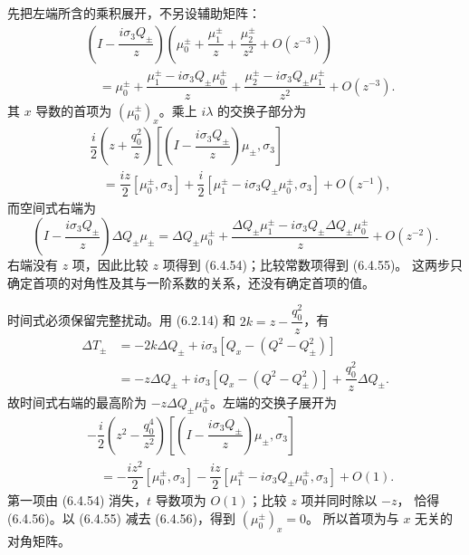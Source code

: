 \documentclass[lang=cn,scheme=chinese,mode=simple,device=normal,color=blue,
math=cm,thmcnt=section,12pt]{elegantbook}
\begin{document}
\begin{callout}[计算：(6.4.52)–(6.4.56) 的乘法展开与逐幂比较]
    先把左端所含的乘积展开，不另设辅助矩阵：
    \[
        \begin{aligned}
             & \left(I-\dfrac{i\sigma_3Q_\pm}{z}\right)
            \left(\mu_0^\pm+\dfrac{\mu_1^\pm}{z}+\dfrac{\mu_2^\pm}{z^2}+O(z^{-3})\right) \\
             & \quad=\mu_0^\pm+\dfrac{\mu_1^\pm-i\sigma_3Q_\pm\mu_0^\pm}{z}
            +\dfrac{\mu_2^\pm-i\sigma_3Q_\pm\mu_1^\pm}{z^2}+O(z^{-3}).
        \end{aligned}
    \]
    其 $x$ 导数的首项为 $(\mu_0^\pm)_x$。乘上 $i\lambda$ 的交换子部分为
    \[
        \begin{aligned}
             & \dfrac{i}{2}\left(z+\dfrac{q_0^2}{z}\right)
            \left[\left(I-\dfrac{i\sigma_3Q_\pm}{z}\right)\mu_\pm,\sigma_3\right] \\
             & \quad=\dfrac{iz}{2}[\mu_0^\pm,\sigma_3]
            +\dfrac{i}{2}[\mu_1^\pm-i\sigma_3Q_\pm\mu_0^\pm,\sigma_3]+O(z^{-1}),
        \end{aligned}
    \]
    而空间式右端为
    \[
        \left(I-\dfrac{i\sigma_3Q_\pm}{z}\right)\Delta Q_\pm\mu_\pm
        =\Delta Q_\pm\mu_0^\pm
        +\dfrac{\Delta Q_\pm\mu_1^\pm-i\sigma_3Q_\pm\Delta Q_\pm\mu_0^\pm}{z}
        +O(z^{-2}).
    \]
    右端没有 $z$ 项，因此比较 $z$ 项得到 (6.4.54)；比较常数项得到 (6.4.55)。
    这两步只确定首项的对角性及其与一阶系数的关系，还没有确定首项的值。

    时间式必须保留完整扰动。用 (6.2.14) 和 $2k=z-\dfrac{q_0^2}{z}$，有
    \[
        \begin{aligned}
            \Delta T_\pm
             & =-2k\Delta Q_\pm+i\sigma_3[Q_x-(Q^2-Q_\pm^2)] \\
             & =-z\Delta Q_\pm+i\sigma_3[Q_x-(Q^2-Q_\pm^2)]
            +\dfrac{q_0^2}{z}\Delta Q_\pm.
        \end{aligned}
    \]
    故时间式右端的最高阶为 $-z\Delta Q_\pm\mu_0^\pm$。左端的交换子展开为
    \[
        \begin{aligned}
             & -\dfrac{i}{2}\left(z^2-\dfrac{q_0^4}{z^2}\right)
            \left[\left(I-\dfrac{i\sigma_3Q_\pm}{z}\right)\mu_\pm,\sigma_3\right] \\
             & \quad=-\dfrac{iz^2}{2}[\mu_0^\pm,\sigma_3]
            -\dfrac{iz}{2}[\mu_1^\pm-i\sigma_3Q_\pm\mu_0^\pm,\sigma_3]+O(1).
        \end{aligned}
    \]
    第一项由 (6.4.54) 消失，$t$ 导数项为 $O(1)$；比较 $z$ 项并同时除以 $-z$，
    恰得 (6.4.56)。以 (6.4.55) 减去 (6.4.56)，得到 $(\mu_0^\pm)_x=0$。
    所以首项为与 $x$ 无关的对角矩阵。
\end{callout}
\end{document}
